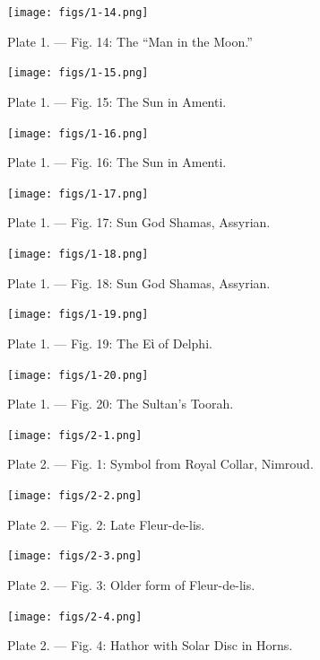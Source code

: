 \documentclass[a4paper, 11pt, oneside, english, landscape, twocolumn]{article}
\begin{document}
\begin{figure}[H]
\centering
\texttt{[image: figs/1-14.png]}
\caption{Plate 1. --- Fig. 14: The ``Man in the Moon.''}
\end{figure}

\begin{figure}[H]
\centering
\texttt{[image: figs/1-15.png]}
\caption{Plate 1. --- Fig. 15: The Sun in Amenti.}
\end{figure}

\begin{figure}[H]
\centering
\texttt{[image: figs/1-16.png]}
\caption{Plate 1. --- Fig. 16: The Sun in Amenti.}
\end{figure}

\begin{figure}[H]
\centering
\texttt{[image: figs/1-17.png]}
\caption{Plate 1. --- Fig. 17: Sun God Shamas, Assyrian.}
\end{figure}

\begin{figure}[H]
\centering
\texttt{[image: figs/1-18.png]}
\caption{Plate 1. --- Fig. 18: Sun God Shamas, Assyrian.}
\end{figure}

\begin{figure}[H]
\centering
\texttt{[image: figs/1-19.png]}
\caption{Plate 1. --- Fig. 19: The Εὶ of Delphi.}
\end{figure}

\begin{figure}[H]
\centering
\texttt{[image: figs/1-20.png]}
\caption{Plate 1. --- Fig. 20: The Sultan's Toorah.}
\end{figure}

\begin{figure}[H]
\centering
\texttt{[image: figs/2-1.png]}
\caption{Plate 2. --- Fig. 1: Symbol from Royal Collar, Nimroud.}
\end{figure}

\begin{figure}[H]
\centering
\texttt{[image: figs/2-2.png]}
\caption{Plate 2. --- Fig. 2: Late Fleur-de-lis.}
\end{figure}

\begin{figure}[H]
\centering
\texttt{[image: figs/2-3.png]}
\caption{Plate 2. --- Fig. 3: Older form of Fleur-de-lis.}
\end{figure}

\begin{figure}[H]
\centering
\texttt{[image: figs/2-4.png]}
\caption{Plate 2. --- Fig. 4: Hathor with Solar Disc in Horns.}
\end{figure}
\end{document}
